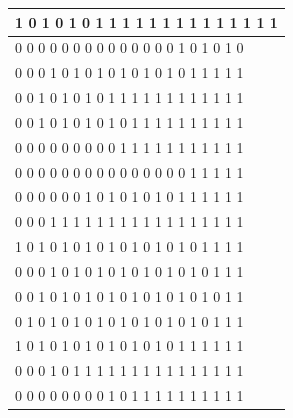\documentclass[11pt, a4paper]{article}
\begin{document}
\begin{enumerate}
\begin{table}[http]
\begin{tabular}{|l|}
			1     0     1     0     1     0     1     1     1     1     1     1     1     1     1     1     1     1     1     1 \\ \hline
			0     0     0     0     0     0     0     0     0     0     0     0     0     0     1     0     1     0     1     0 \\ \hline
			0     0     0     1     0     1     0     1     0     1     0     1     0     1     0     1     1     1     1     1 \\ \hline
			0     0     1     0     1     0     1     0     1     1     1     1     1     1     1     1     1     1     1     1 \\ \hline
			0     0     1     0     1     0     1     0     1     0     1     1     1     1     1     1     1     1     1     1 \\ \hline
			0     0     0     0     0     0     0     0     0     1     1     1     1     1     1     1     1     1     1     1 \\ \hline
			0     0     0     0     0     0     0     0     0     0     0     0     0     0     0     1     1     1     1     1 \\ \hline
			0     0     0     0     0     0     1     0     1     0     1     0     1     0     1     1     1     1     1     1 \\ \hline
			0     0     0     1     1     1     1     1     1     1     1     1     1     1     1     1     1     1     1     1 \\ \hline
			1     0     1     0     1     0     1     0     1     0     1     0     1     0     1     0     1     1     1     1 \\ \hline
			0     0     0     1     0     1     0     1     0     1     0     1     0     1     0     1     0     1     1     1 \\ \hline
			0     0     1     0     1     0     1     0     1     0     1     0     1     0     1     0     1     0     1     1 \\ \hline
			0     1     0     1     0     1     0     1     0     1     0     1     0     1     0     1     0     1     1     1 \\ \hline
			1     0     1     0     1     0     1     0     1     0     1     0     1     0     1     1     1     1     1     1 \\ \hline
			0     0     0     1     0     1     1     1     1     1     1     1     1     1     1     1     1     1     1     1 \\ \hline
			0     0     0     0     0     0     0     0     1     0     1     1     1     1     1     1     1     1     1     1 \\ \hline

\end{tabular}
\end{table}
\end{enumerate}
\end{document}
